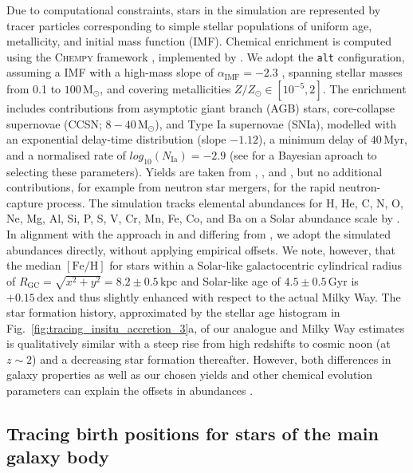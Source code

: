 \documentclass[fleqn,usenatbib]{mnras}
\begin{document}
Due to computational constraints, stars in the simulation are represented by tracer particles corresponding to simple stellar populations of uniform age, metallicity, and initial mass function (IMF). Chemical enrichment is computed using the \textsc{Chempy} framework \citep{Rybizki2017}, implemented by \citet{Buck2021}. We adopt the \texttt{alt} configuration, assuming a \citet{Chabrier2003} IMF with a high-mass slope of $\alpha_\text{IMF} = -2.3$ , spanning stellar masses from 0.1 to $100\,\mathrm{M_\odot}$, and covering metallicities $Z/Z_\odot \in [10^{-5},2]$. The enrichment includes contributions from asymptotic giant branch (AGB) stars, core-collapse supernovae (CCSN; $8 - 40\,\mathrm{M_\odot}$), and Type Ia supernovae (SNIa), modelled with an exponential delay-time distribution (slope $-1.12$), a minimum delay of $40\,\mathrm{Myr}$, and a normalised rate of $log_{10}(N_\mathrm{Ia}) = -2.9$ (see \citealt{Buck2025,Guenes2025} for a Bayesian aproach to selecting these parameters). Yields are taken from \citet[][CCSN]{Chieffi2004}, \citet[][SNIa]{Seitenzahl2013}, and \citet[][AGB; \texttt{new\_fid} yields in \citealt{Buck2021}]{Karakas2016}, but no additional contributions, for example from neutron star mergers, for the rapid neutron-capture process. The simulation tracks elemental abundances for H, He, C, N, O, Ne, Mg, Al, Si, P, S, V, Cr, Mn, Fe, Co, and Ba on a Solar abundance scale by \citet{Asplund2009}. In alignment with the approach in \citet{Buder2025} and differing from \citet{Buder2024}, we adopt the simulated abundances directly, without applying empirical offsets. We note, however, that the median $\mathrm{[Fe/H]}$ for stars within a Solar-like galactocentric cylindrical radius of $R_\mathrm{GC} = \sqrt{x^2+y^2} = 8.2 \pm 0.5\,\mathrm{kpc}$ \citep{BlandHawthorn_Gerhard2016} and Solar-like age of $4.5 \pm 0.5\,\mathrm{Gyr}$ \citep{Soderblom2010} is $+0.15\,\mathrm{dex}$ and thus slightly enhanced with respect to the actual Milky Way. The star formation history, approximated by the stellar age histogram in Fig.~\ref{fig:tracing_insitu_accretion_3}a, of our analogue and Milky Way estimates \citep{Snaith2015} is qualitatively similar with a steep rise from high redshifts to cosmic noon (at $z\sim2$) and a decreasing star formation thereafter. However, both differences in galaxy properties as well as our chosen yields and other chemical evolution parameters can explain the offsets in abundances \citep[see also][]{Buck2021}.

\subsection{Tracing birth positions for stars of the main galaxy body}  \label{sec:data_birth_positions}
\end{document}
